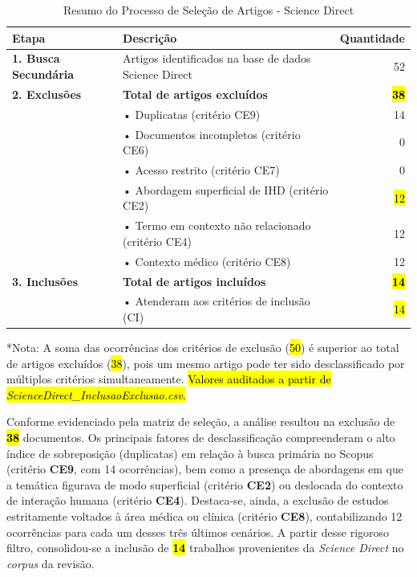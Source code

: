 \documentclass[
	12pt,				%
	oneside,			%
	a4paper,			%
	english,			%
	brazil				%
	]{abntex2ppgsi}
\begin{document}
\begin{table}[h]
\centering
\caption{Resumo do Processo de Seleção de Artigos - Science Direct}
\label{tab:resumo_selecao_SD}
\begin{tabularx}{\textwidth}{lXr}
\toprule
\textbf{Etapa} & \textbf{Descrição} & \textbf{Quantidade} \\
\midrule
\textbf{1. Busca Secundária} & Artigos identificados na base de dados Science Direct & 52 \\
\midrule
\textbf{2. Exclusões} & \textbf{Total de artigos excluídos} & \hl{\textbf{38}} \\
& \hspace{0.5cm}• Duplicatas (critério CE9) & 14 \\
& \hspace{0.5cm}• Documentos incompletos (critério CE6) & 0 \\
& \hspace{0.5cm}• Acesso restrito (critério CE7) & 0 \\
& \hspace{0.5cm}• Abordagem superficial de IHD (critério CE2) & \hl{12} \\
& \hspace{0.5cm}• Termo em contexto não relacionado (critério CE4) & 12 \\
& \hspace{0.5cm}• Contexto médico (critério CE8) & 12 \\
\midrule
\textbf{3. Inclusões} & \textbf{Total de artigos incluídos} & \hl{\textbf{14}} \\
& \hspace{0.5cm}• Atenderam aos critérios de inclusão (CI) & \hl{14} \\
\bottomrule
\end{tabularx}
\vspace{0.2cm}
\footnotesize{*Nota: A soma das ocorrências dos critérios de exclusão (\hl{50}) é superior ao total de artigos excluídos (\hl{38}), pois um mesmo artigo pode ter sido desclassificado por múltiplos critérios simultaneamente. \hl{Valores auditados a partir de \textit{ScienceDirect\_InclusaoExclusao.csv}.}}
\end{table}

    Conforme evidenciado pela matriz de seleção, a análise resultou na exclusão de \hl{\textbf{38}} documentos. Os principais fatores de desclassificação compreenderam o alto índice de sobreposição (duplicatas) em relação à busca primária no Scopus (critério \textbf{CE9}, com 14 ocorrências), bem como a presença de abordagens em que a temática figurava de modo superficial (critério \textbf{CE2}) ou deslocada do contexto de interação humana (critério \textbf{CE4}). Destaca-se, ainda, a exclusão de estudos estritamente voltados à área médica ou clínica (critério \textbf{CE8}), contabilizando 12 ocorrências para cada um desses três últimos cenários. A partir desse rigoroso filtro, consolidou-se a inclusão de \hl{\textbf{14}} trabalhos provenientes da \textit{Science Direct} no \textit{corpus} da revisão.
\end{document}
